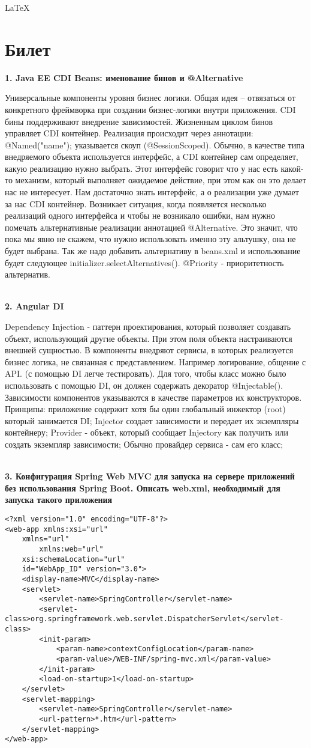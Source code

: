 \documentclass{article}
\newcommand{\bil}[5]{%
        \section{Билет}
        \textbf{1. #1}

        #4
        \\
        \textbf{2. #2}
        
        #5
        \\
        \textbf{3. #3}
}
\begin{document}
\begin{center}
    \LaTeX
\end{center}
\bil{Java EE CDI Beans: именование бинов и @Alternative}{Angular DI}{Конфигурация Spring Web MVC для запуска на сервере приложений без использования Spring Boot. Описать web.xml, необходимый для запуска такого приложения}{
    Универсальные компоненты уровня бизнес логики. Общая идея – отвязаться 
    от конкретного фреймворка при создании бизнес-логики внутри приложения.
    CDI бины поддерживают внедрение зависимостей. 
    Жизненным циклом бинов управляет CDI контейнер. 
    Реализация происходит через аннотации: @Named("name"); 
    указывается скоуп (@SessionScoped).
    Обычно, в качестве типа внедряемого объекта используется интерфейс, а CDI контейнер сам определяет, какую реализацию нужно выбрать.
    Этот интерфейс говорит что у нас есть какой-то механизм, который выполняет ожидаемое действие, при этом как он это делает нас не интересует.
    Нам достаточно знать интерфейс, а о реализации уже думает за нас CDI контейнер.
    Возникает ситуация, когда появляется несколько реализаций одного интерфейса и чтобы не возникало ошибки, нам нужно помечать альтернативные реализации аннотацией @Alternative.
    Это значит, что пока мы явно не скажем, что нужно использовать именно эту альтушку, она не будет выбрана.
    Так же надо добавить альтернативу в beans.xml и использование будет следующее initializer.selectAlternatives(). @Priority - приоритетность альтернатив.
}{
    Dependency Injection - паттерн проектирования, который позволяет создавать объект, использующий другие объекты. 
    При этом поля объекта настраиваются внешней сущностью. В компоненты внедряют сервисы, 
    в которых реализуется бизнес логика, не связанная с представлением. Например логирование, общение с API. 
    (с помощью DI легче тестировать). Для того, чтобы класс можно было использовать с помощью DI, он должен содержать декоратор @Injectable(). 
    Зависимости компонентов указываются в качестве параметров их конструкторов. Принципы: приложение содержит хотя бы один глобальный инжектор 
    (root) который занимается DI; Injector создает зависимости и передает их экземпляры контейнеру;
     Provider - объект, который сообщает Injectory как получить или создать экземпляр зависимости; 
     Обычно провайдер сервиса - сам его класс;
}
\begin{lstlisting}[frame=single, basicstyle=\ttfamily, breaklines=true, breakatwhitespace=true, postbreak=\mbox{\textcolor{red}{$\hookrightarrow$}\space}]
<?xml version="1.0" encoding="UTF-8"?>
<web-app xmlns:xsi="url"
    xmlns="url"
        xmlns:web="url"
    xsi:schemaLocation="url"
    id="WebApp_ID" version="3.0">
    <display-name>MVC</display-name>
    <servlet>
        <servlet-name>SpringController</servlet-name>
        <servlet-class>org.springframework.web.servlet.DispatcherServlet</servlet-class>
        <init-param>
            <param-name>contextConfigLocation</param-name>
            <param-value>/WEB-INF/spring-mvc.xml</param-value>
        </init-param>
        <load-on-startup>1</load-on-startup>
    </servlet>
    <servlet-mapping>
        <servlet-name>SpringController</servlet-name>
        <url-pattern>*.htm</url-pattern>
    </servlet-mapping>
</web-app>
\end{lstlisting}
\end{document}
